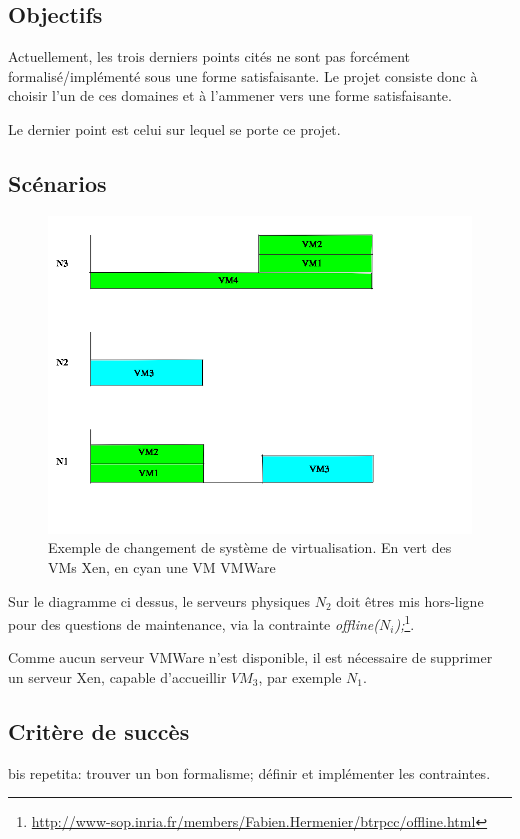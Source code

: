 \documentclass[a4paper]{article}
\begin{document}
\subsection{Objectifs}
Actuellement, les trois derniers points cités ne sont pas forcément
formalisé/implémenté sous une forme satisfaisante. Le projet consiste
donc à choisir l'un de ces domaines et à l'ammener vers une forme
satisfaisante.

Le dernier point est celui sur lequel se porte ce projet.
\subsection{Scénarios}
\begin{figure}[!ht]
        \centering
        \includegraphics[scale=.3]{imgs/vmreconf.png}
	\caption{\label{usecase} Exemple de changement de système de virtualisation. En vert des VMs Xen, en cyan une VM VMWare}
\end{figure}

Sur le diagramme ci dessus, le serveurs physiques $N_2$ doit êtres mis
hors-ligne pour des questions de maintenance, via la contrainte
\textit{offline($N_i$);}\footnote{\url{http://www-sop.inria.fr/members/Fabien.Hermenier/btrpcc/offline.html}}.

Comme aucun serveur VMWare n'est disponible, il est nécessaire de supprimer
un serveur Xen, capable d'accueillir $VM_3$, par exemple $N_1$.

\subsection{Critère de succès}
bis repetita: trouver un bon formalisme; définir et implémenter
les contraintes.
\end{document}
